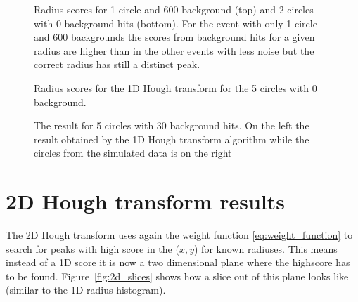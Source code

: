 \documentclass[11pt,twoside]{scrreprt}
\begin{document}
\begin{figure}[htp]
        \centering

                \label{fig:2c0bg_radius1}%
                \label{fig:2c0b_radius2}
                \caption{Radius scores for 1 circle and 600 background (top) and 2 circles with 0 background hits (bottom). For the event
                with only 1 circle and 600 backgrounds the scores from background hits for a given radius are higher than in the other
                events with less noise but the correct radius has still a distinct peak.}
                \label{fig:1_2_c_radius}
\end{figure}
\begin{figure}[htb]
\centering
  

        \caption{Radius scores for the 1D Hough transform for the 5 circles with 0 background.}\label{fig:1d_ht_radius}
\end{figure}

\begin{figure}[ht!]
  \centering
  \caption[5 circles, 30 background hits result]{The result for 5 circles with 30 background hits. On the left the result obtained by 
  the 1D Hough transform algorithm while the circles from the simulated data is on the right}
  \label{fig:1d_5c_30bg}
\end{figure}



\clearpage
\section{2D Hough transform results} %
\label{sec:2d_hough_transform_results}
The 2D Hough transform uses again the weight function \ref{eq:weight_function} to search for peaks with high
score in the ($x,y$) for known radiuses. This means instead of a 1D score it is now a two dimensional plane 
where the highscore has to be found. Figure~\ref{fig:2d_slices} shows how a slice out of this plane looks like 
(similar to the 1D radius histogram).
\end{document}
